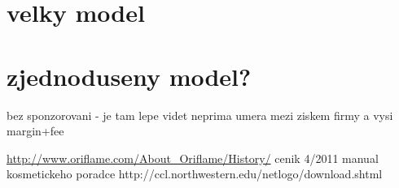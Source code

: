 \documentclass[a4wide,12pt]{report}
\begin{document}
\section{velky model}
\section{zjednoduseny model?}
bez sponzorovani - je tam lepe videt neprima umera mezi ziskem firmy a vysi margin+fee
\begin{thebibliography}{9}


\end{thebibliography}
\url{http://www.oriflame.com/About_Oriflame/History/}
cenik 4/2011
manual kosmetickeho poradce
http://ccl.northwestern.edu/netlogo/download.shtml
\end{document}
